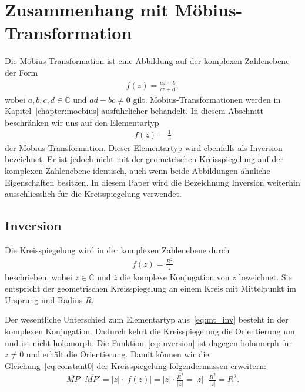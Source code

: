 %
%
%
%
\section{Zusammenhang mit Möbius-Transformation
\label{geradlinig:section:zusammenhang_mit_moebius_transformation}}
Die Möbius-Transformation ist eine Abbildung auf der komplexen Zahlenebene der Form
\begin{align*}
    f(z)=\frac{az+b}{cz+d},
\end{align*}
wobei $a,b,c,d\in\mathbb{C}$ und $ad-bc\neq0$ gilt.
Möbius-Transformationen werden in Kapitel~\ref{chapter:moebius}
ausführlicher behandelt.
In diesem Abschnitt beschränken wir uns auf den Elementartyp
\begin{align}
    f(z)=\frac{1}{z}
    \label{eq:mt_inv}
\end{align}
der Möbius-Transformation.
Dieser Elementartyp wird ebenfalls als Inversion bezeichnet.
%
Er ist jedoch nicht mit der geometrischen Kreisspiegelung 
auf der komplexen Zahlenebene identisch, 
auch wenn beide Abbildungen ähnliche Eigenschaften besitzen.
In diesem Paper wird die Bezeichnung Inversion 
weiterhin ausschliesslich für die Kreisspiegelung verwendet.

\subsection{Inversion}
Die Kreisspiegelung wird in der komplexen Zahlenebene durch
\begin{align}
    f(z)=\frac{R^2}{\overline{z}}
    \label{eq:inversion}
\end{align}
beschrieben, wobei $z\in\mathbb{C}$ und $\overline{z}$ 
die komplexe Konjugation von $z$ bezeichnet.
Sie entspricht der geometrischen Kreisspiegelung 
an einem Kreis mit Mittelpunkt im Ursprung und Radius $R$.

Der wesentliche Unterschied zum Elementartyp aus~\eqref{eq:mt_inv} 
besteht in der komplexen Konjugation.
Dadurch kehrt die Kreisspiegelung die Orientierung um und 
ist nicht holomorph.
Die Funktion~\eqref{eq:inversion} ist dagegen holomorph für
$z\neq0$ und erhält die Orientierung.
Damit können wir die Gleichung~\eqref{eq:constant0}
der Kreisspiegelung folgendermassen erweitern:
\begin{align*}
    \overline{MP} \cdot \overline{MP'} 
    = 
    |z| \cdot |f(z)|
    = 
    |z| \cdot \frac{R^2}{|\overline{z}|} 
    =
    |z| \cdot \frac{R^2}{|z|} 
    = R^2.
\end{align*}

